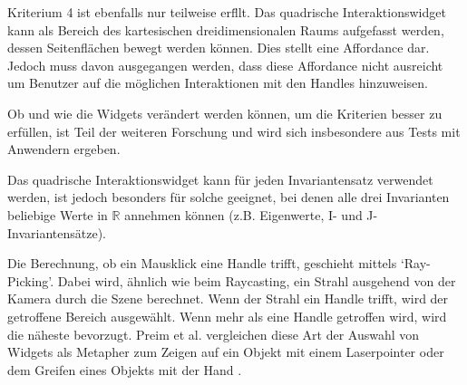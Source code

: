 \documentclass[a4paper,fontsize=12pt,toc=bib,halfparskip]{scrartcl}
\begin{document}
Kriterium 4 ist ebenfalls nur teilweise erf\"llt. Das quadrische Interaktionswidget kann als Bereich des kartesischen dreidimensionalen Raums aufgefasst werden, dessen Seitenfl\"achen bewegt werden k\"onnen. Dies stellt eine Affordance dar. Jedoch muss davon ausgegangen werden, dass diese Affordance nicht ausreicht um Benutzer auf die m\"oglichen Interaktionen mit den Handles hinzuweisen. 

Ob und wie die Widgets ver\"andert werden k\"onnen, um die Kriterien besser zu erf\"ullen, ist Teil der weiteren Forschung und wird sich insbesondere aus Tests mit Anwendern ergeben.

Das quadrische Interaktionswidget kann f\"ur jeden Invariantensatz verwendet werden, ist jedoch besonders f\"ur solche geeignet, bei denen alle drei Invarianten beliebige Werte in $\mathbb{R}$ annehmen k\"onnen (z.B. Eigenwerte, I- und J-Invariantens\"atze).

Die Berechnung, ob ein Mausklick eine Handle trifft, geschieht mittels `Ray-Picking'. Dabei wird, \"ahnlich wie beim Raycasting, ein Strahl ausgehend von der Kamera durch die Szene berechnet. Wenn der Strahl ein Handle trifft, wird der getroffene Bereich ausgew\"ahlt.  Wenn mehr als eine Handle getroffen wird, wird die n\"aheste bevorzugt. Preim et al. vergleichen diese Art der Auswahl von Widgets als Metapher zum Zeigen auf ein Objekt mit einem Laserpointer oder dem Greifen eines Objekts mit der Hand \cite[344]{preim2015interaktive}.
\end{document}
